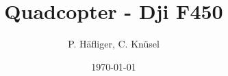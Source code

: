 \title{Quadcopter - Dji F450}  
\author{P. Häfliger, C. Knüsel}
\date{\today} 

\begin{frame}[plain]
\titlepage
\end{frame} 